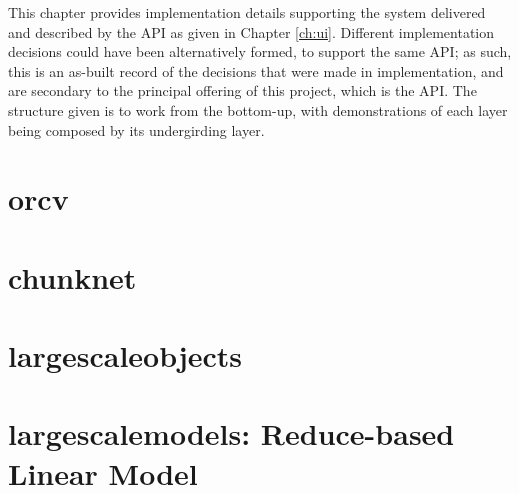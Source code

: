 This chapter provides implementation details supporting the system delivered and described by the API as given in Chapter \cref{ch:ui}.
Different implementation decisions could have been alternatively formed, to support the same API; as such, this is an as-built record of the decisions that were made in implementation, and are secondary to the principal offering of this project, which is the API.
The structure given is to work from the bottom-up, with demonstrations of each layer being composed by its undergirding layer.

\section{orcv}

\section{chunknet}

\section{largescaleobjects}

\section{largescalemodels: Reduce-based Linear Model}

